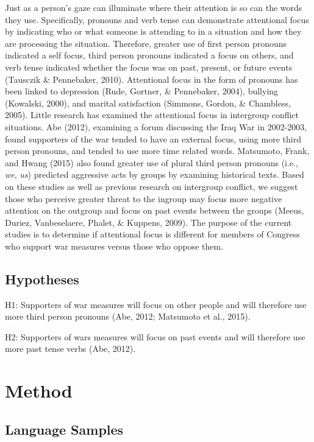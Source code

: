 \documentclass[english,man]{apa6}
\theoremstyle{definition}
\theoremstyle{definition}
\theoremstyle{definition}
\theoremstyle{remark}
\begin{document}
Just as a person's gaze can illuminate where their attention is so can
the words they use. Specifically, pronouns and verb tense can
demonstrate attentional focus by indicating who or what someone is
attending to in a situation and how they are processing the situation.
Therefore, greater use of first person pronouns indicated a self focus,
third person pronouns indicated a focus on others, and verb tense
indicated whether the focus was on past, present, or future events
(Tausczik \& Pennebaker, 2010). Attentional focus in the form of
pronouns has been linked to depression (Rude, Gortner, \& Pennebaker,
2004), bullying (Kowalski, 2000), and marital satisfaction (Simmons,
Gordon, \& Chambless, 2005). Little research has examined the
attentional focus in intergroup conflict situations. Abe (2012),
examining a forum discussing the Iraq War in 2002-2003, found supporters
of the war tended to have an external focus, using more third person
pronouns, and tended to use more time related words. Matsumoto, Frank,
and Hwang (2015) also found greater use of plural third person pronouns
(i.e., \emph{we}, \emph{us}) predicted aggressive acts by groups by
examining historical texts. Based on these studies as well as previous
research on intergroup conflict, we suggest those who perceive greater
threat to the ingroup may focus more negative attention on the outgroup
and focus on past events between the groups (Meeus, Duriez,
Vanbeselaere, Phalet, \& Kuppens, 2009). The purpose of the current
studies is to determine if attentional focus is different for members of
Congress who support war measures versus those who oppose them.

\subsection{Hypotheses}\label{hypotheses}

H1: Supporters of war measures will focus on other people and will
therefore use more third person pronouns (Abe, 2012; Matsumoto et al.,
2015).

H2: Supporters of wars measures will focus on past events and will
therefore use more past tense verbs (Abe, 2012).

\section{Method}\label{method}

\subsection{Language Samples}\label{language-samples}
\end{document}
